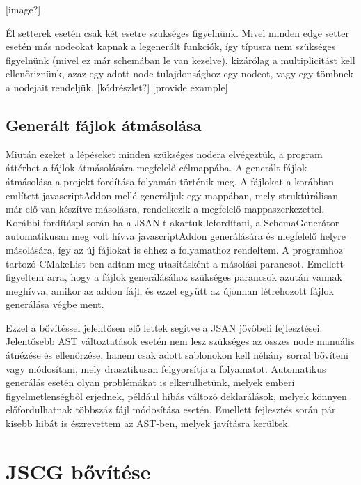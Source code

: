 [image?]

Él setterek esetén csak két esetre szükséges figyelnünk. Mivel minden edge setter esetén más nodeokat kapnak a legenerált funkciók, így típusra nem szükséges figyelnünk (mivel ez már schemában le van kezelve), kizárólag a multiplicitást kell ellenőriznünk, azaz egy adott node tulajdonsághoz egy nodeot, vagy egy tömbnek a nodejait rendeljük.
[kódrészlet?]
[provide example]

\subsection{Generált fájlok átmásolása}

Miután ezeket a lépéseket minden szükséges nodera elvégeztük, a program áttérhet a fájlok átmásolására megfelelő célmappába.
A generált fájlok átmásolása a projekt fordítása folyamán történik meg. A fájlokat a korábban említett javascriptAddon mellé generáljuk egy mappában, mely struktúrálisan már elő van készítve másolásra, rendelkezik a megfelelő mappaszerkezettel. Korábbi fordításpl során ha a JSAN-t akartuk lefordítani, a SchemaGenerátor automatikusan meg volt hívva javascriptAddon generálására és megfelelő helyre másolására, így az új fájlokat is ehhez a folyamathoz rendeltem. A programhoz tartozó CMakeList-ben adtam meg utasításként a másolási parancsot. Emellett figyeltem arra, hogy a fájlok generálásához szükséges parancsok azután vannak meghívva, amikor az addon fájl, és ezzel együtt az újonnan létrehozott fájlok generálása végbe ment.

Ezzel a bővítéssel jelentősen elő lettek segítve a JSAN jövőbeli fejlesztései. Jelentősebb AST változtatások esetén nem lesz szükséges az összes node manuális átnézése és ellenőrzése, hanem csak adott sablonokon kell néhány sorral bővíteni vagy módosítani, mely drasztikusan felgyorsítja a folyamatot. Automatikus generálás esetén olyan problémákat is elkerülhetünk, melyek emberi figyelmetlenségből erjednek, például hibás változó deklarálások, melyek könnyen előfordulhatnak többszáz fájl módosítása esetén. Emellett fejlesztés során pár kisebb hibát is észrevettem az AST-ben, melyek javításra kerültek. 

\section{JSCG bővítése}


